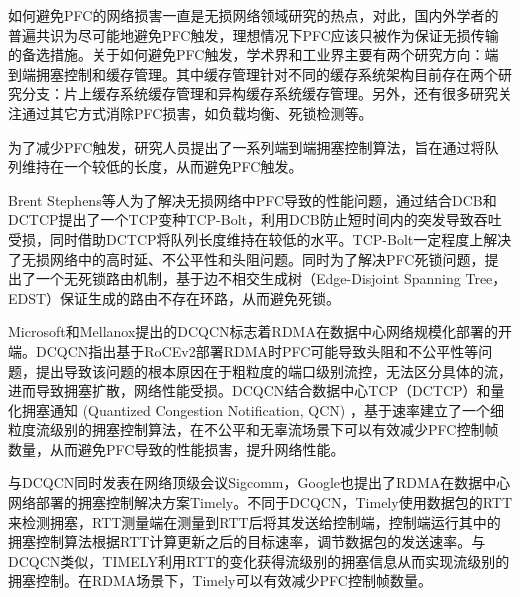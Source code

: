 



如何避免PFC的网络损害一直是无损网络领域研究的热点，对此，国内外学者的普遍共识为尽可能地避免PFC触发，理想情况下PFC应该只被作为保证无损传输的备选措施。关于如何避免PFC触发，学术界和工业界主要有两个研究方向：端到端拥塞控制和缓存管理。其中缓存管理针对不同的缓存系统架构目前存在两个研究分支：片上缓存系统缓存管理和异构缓存系统缓存管理。另外，还有很多研究关注通过其它方式消除PFC损害，如负载均衡、死锁检测等。


为了减少PFC触发，研究人员提出了一系列端到端拥塞控制算法，旨在通过将队列维持在一个较低的长度，从而避免PFC触发。

Brent Stephens等人为了解决无损网络中PFC导致的性能问题，通过结合DCB和DCTCP提出了一个TCP变种TCP-Bolt\cite{INFOCOM14TCP-Bolt}，利用DCB防止短时间内的突发导致吞吐受损，同时借助DCTCP将队列长度维持在较低的水平。TCP-Bolt一定程度上解决了无损网络中的高时延、不公平性和头阻问题。同时为了解决PFC死锁问题，提出了一个无死锁路由机制，基于边不相交生成树（Edge-Disjoint Spanning Tree，EDST）保证生成的路由不存在环路，从而避免死锁。

Microsoft和Mellanox提出的DCQCN\cite{SIGCOMM15DCQCN}标志着RDMA在数据中心网络规模化部署的开端。DCQCN指出基于RoCEv2部署RDMA时PFC可能导致头阻和不公平性等问题，提出导致该问题的根本原因在于粗粒度的端口级别流控，无法区分具体的流，进而导致拥塞扩散，网络性能受损。DCQCN结合数据中心TCP\cite{SIGCOMM10DCTCP}（DCTCP）和量化拥塞通知 (Quantized Congestion Notification, QCN) ，基于速率建立了一个细粒度流级别的拥塞控制算法，在不公平和无辜流场景下可以有效减少PFC控制帧数量，从而避免PFC导致的性能损害，提升网络性能。

与DCQCN同时发表在网络顶级会议Sigcomm，Google也提出了RDMA在数据中心网络部署的拥塞控制解决方案Timely\cite{SIGCOMM15TIMELY}。不同于DCQCN，Timely使用数据包的RTT来检测拥塞，RTT测量端在测量到RTT后将其发送给控制端，控制端运行其中的拥塞控制算法根据RTT计算更新之后的目标速率，调节数据包的发送速率。与DCQCN类似，TIMELY利用RTT的变化获得流级别的拥塞信息从而实现流级别的拥塞控制。在RDMA场景下，Timely可以有效减少PFC控制帧数量。

